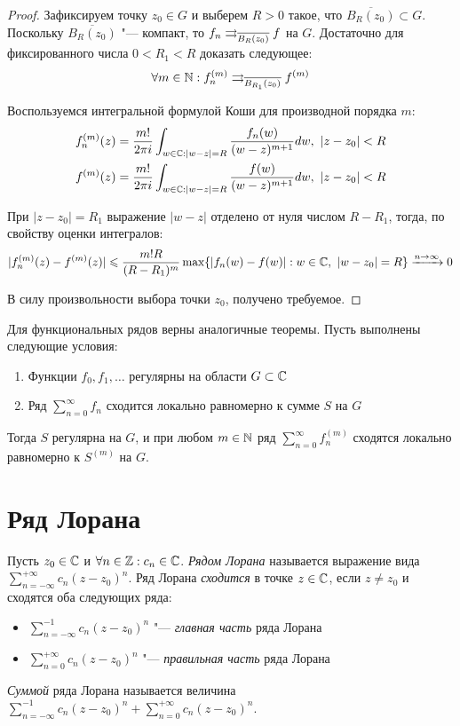 \begin{proof}
	Зафиксируем точку $z_0 \in G$ и выберем $R > 0$ такое, что $\overline{B_R(z_0)} \subset G$. Поскольку $\overline{B_R(z_0)}$ "--- компакт, то $f_n \rightrightarrows_{\overline{B_R(z_0)}} f$ на $G$. Достаточно для фиксированного числа $0 < R_1 < R$ доказать следующее:
	\[\forall m \in \mathbb{N}: f_n^{(m)} \rightrightarrows_{\overline{B_{R_1}(z_0)}} f^{(m)}\]
	
	Воспользуемся интегральной формулой Коши для производной порядка $m$:
	\begin{gather*}
		f_n^{(m)}(z) = \frac{m!}{2\pi i}\int_{w \in \mathbb{C}: |w - z| = R}\frac{f_n(w)}{(w - z)^{m+1}}dw,~|z - z_0| < R\\
		f^{(m)}(z) = \frac{m!}{2\pi i}\int_{w \in \mathbb{C}: |w - z| = R}\frac{f(w)}{(w - z)^{m+1}}dw,~|z - z_0| < R
	\end{gather*}
	
	При $|z - z_0| = R_1$ выражение $|w - z|$ отделено от нуля числом $R - R_1$, тогда, по свойству оценки интегралов:
	\[|f_n^{(m)}(z) - f^{(m)}(z)| \leqslant \frac{m!R}{(R - R_1)^m}\max\{|f_n(w) - f(w)| : w \in \mathbb{C},~|w - z_0| = R\} \xrightarrow{n \to \infty} 0\]
	
	В силу произвольности выбора точки $z_0$, получено требуемое.
\end{proof}

\begin{note}
	Для функциональных рядов верны аналогичные теоремы. Пусть выполнены следующие условия:
	\begin{enumerate}
		\item Функции $f_0, f_1, \dotsc$ регулярны на области $G \subset \mathbb{C}$
		\item Ряд $\sum_{n=0}^\infty f_n$ сходится локально равномерно к сумме $S$ на $G$
	\end{enumerate}
	
	Тогда $S$ регулярна на $G$, и при любом $m \in \mathbb{N}$ ряд $\sum_{n=0}^\infty f_n^{(m)}$ сходятся локально равномерно к $S^{(m)}$ на $G$.
\end{note}

\section{Ряд Лорана}

\begin{definition}
	Пусть $z_0 \in \mathbb{C}$ и $\forall n \in \mathbb{Z}: c_n \in \mathbb{C}$. \textit{Рядом Лорана} называется выражение вида $\sum_{n = -\infty}^{+\infty}c_n(z - z_0)^n$. Ряд Лорана \textit{сходится} в точке $z \in \mathbb{C}$, если $z \ne z_0$ и сходятся оба следующих ряда:
	\begin{itemize}
		\item $\sum_{n = -\infty}^{-1}c_n(z - z_0)^n$ "--- \textit{главная часть} ряда Лорана
		\item $\sum_{n = 0}^{+\infty}c_n(z - z_0)^n$ "--- \textit{правильная часть} ряда Лорана
	\end{itemize}
	
	\textit{Суммой} ряда Лорана называется величина $\sum_{n = -\infty}^{-1}c_n(z - z_0)^n + \sum_{n = 0}^{+\infty}c_n(z - z_0)^n$.
\end{definition}

